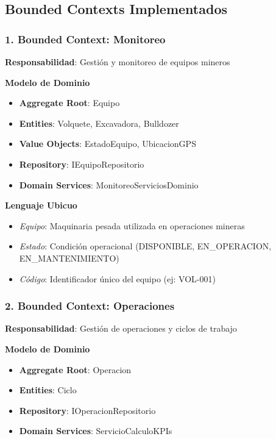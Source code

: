 \documentclass[12pt,a4paper]{article}
\begin{document}
\subsection{Bounded Contexts Implementados}

\subsubsection{1. Bounded Context: Monitoreo}

\textbf{Responsabilidad}: Gestión y monitoreo de equipos mineros

\textbf{Modelo de Dominio}
\begin{itemize}
    \item \textbf{Aggregate Root}: Equipo
    \item \textbf{Entities}: Volquete, Excavadora, Bulldozer
    \item \textbf{Value Objects}: EstadoEquipo, UbicacionGPS
    \item \textbf{Repository}: IEquipoRepositorio
    \item \textbf{Domain Services}: MonitoreoServiciosDominio
\end{itemize}

\textbf{Lenguaje Ubicuo}
\begin{itemize}
    \item \textit{Equipo}: Maquinaria pesada utilizada en operaciones mineras
    \item \textit{Estado}: Condición operacional (DISPONIBLE, EN\_OPERACION, EN\_MANTENIMIENTO)
    \item \textit{Código}: Identificador único del equipo (ej: VOL-001)
\end{itemize}

\subsubsection{2. Bounded Context: Operaciones}

\textbf{Responsabilidad}: Gestión de operaciones y ciclos de trabajo

\textbf{Modelo de Dominio}
\begin{itemize}
    \item \textbf{Aggregate Root}: Operacion
    \item \textbf{Entities}: Ciclo
    \item \textbf{Repository}: IOperacionRepositorio
    \item \textbf{Domain Services}: ServicioCalculoKPIs
\end{itemize}
\end{document}
